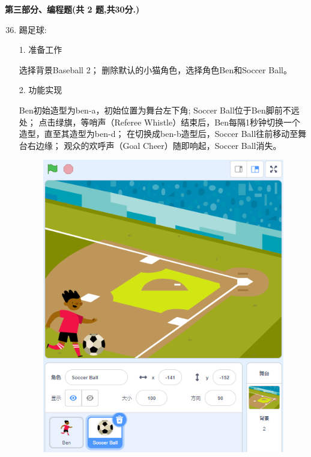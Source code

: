 \documentclass[10pt, a4paper]{article}
\begin{document}
    \newpage
    {\noindent \textbf{第三部分、编程题(共 2 题,共30分.)}}
    \begin{enumerate}
        \setcounter{enumi}{35}
        
        \item 踢足球:
        
        1. 准备工作
        \begin{tasks}[label = (\arabic*)]
            \task 选择背景Baseball 2；
            \task 删除默认的小猫角色，选择角色Ben和Soccer Ball。
        \end{tasks}
        2. 功能实现
        \begin{tasks}[label = (\arabic*)]
            \task Ben初始造型为ben-a，初始位置为舞台左下角;
            \task Soccer Ball位于Ben脚前不远处；
            \task 点击绿旗，等哨声（Referee Whistle）结束后，Ben每隔1秒钟切换一个造型，直至其造型为ben-d；
            \task 在切换成ben-b造型后，Soccer Ball往前移动至舞台右边缘；
            \task 观众的欢呼声（Goal Cheer）随即响起，Soccer Ball消失。
        \end{tasks}
        \begin{figure}[htbp]
            \centering
            \begin{minipage}[t]{.3\textwidth}
                \centering
                \includegraphics[width=\textwidth]{36.png}

\end{minipage}
\end{figure}
\end{enumerate}
\end{document}
